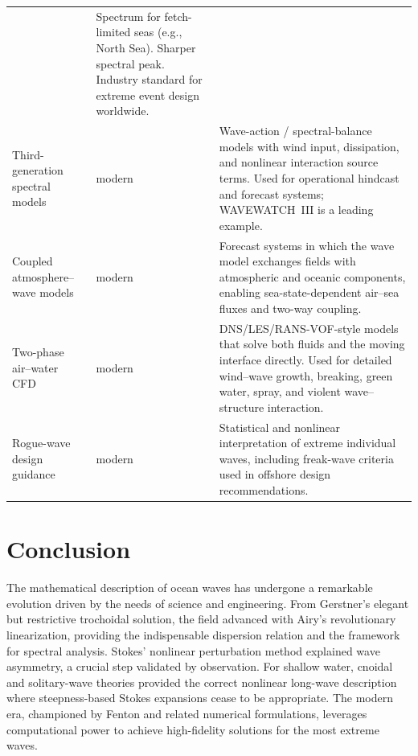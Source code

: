 \documentclass[journal,10pt,twocolumn]{IEEEtran}
\begin{document}
\begin{table}[t]
\begin{tabular}{@{}L{2.6cm}lL{8.1cm}@{}}
      & Spectrum for fetch-limited seas (e.g., North Sea). Sharper spectral peak.
        Industry standard for extreme event design worldwide. \\
    Third-generation spectral models & modern
      & Wave-action / spectral-balance models with wind input, dissipation, and
        nonlinear interaction source terms. Used for operational hindcast and forecast
        systems; WAVEWATCH~III is a leading example. \\
    Coupled atmosphere--wave models & modern
      & Forecast systems in which the wave model exchanges fields with atmospheric and
        oceanic components, enabling sea-state-dependent air--sea fluxes and two-way
        coupling. \\
    Two-phase air--water CFD & modern
      & DNS/LES/RANS-VOF-style models that solve both fluids and the moving interface
        directly. Used for detailed wind--wave growth, breaking, green water, spray,
        and violent wave--structure interaction. \\
    Rogue-wave design guidance & modern
      & Statistical and nonlinear interpretation of extreme individual waves,
        including freak-wave criteria used in offshore design recommendations. \\
    \bottomrule
  \end{tabular}
\end{table}

\section{Conclusion}
\label{sec:conclusion}

The mathematical description of ocean waves has undergone a remarkable evolution driven
by the needs of science and engineering.
From Gerstner's elegant but restrictive trochoidal solution, the field advanced with
Airy's revolutionary linearization, providing the indispensable dispersion relation and
the framework for spectral analysis.
Stokes' nonlinear perturbation method explained wave asymmetry, a crucial step validated
by observation.
For shallow water, cnoidal and solitary-wave theories provided the correct nonlinear
long-wave description where steepness-based Stokes expansions cease to be appropriate.
The modern era, championed by Fenton and related numerical formulations, leverages
computational power to achieve high-fidelity solutions for the most extreme waves.
\end{document}
